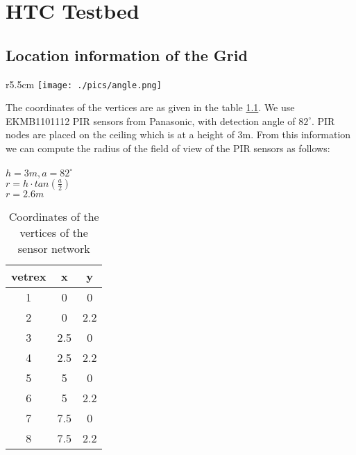 \chapter{HTC Testbed}
\label{app:A}
\section{Location information of the Grid}
\begin{wrapfigure}{r}{5.5cm}
\texttt{[image: ./pics/angle.png]}
\label{fig:height}
\end{wrapfigure}
The coordinates of the vertices are as given in the table \ref{tab:htc34xy}. We use EKMB1101112 PIR sensors from Panasonic, with detection angle of $82^\circ$.
PIR nodes are placed on the ceiling which is at a height of 3m. From this information we can compute the radius of the field of view of the PIR sensors as follows:\\\\
$h=3m, a = 82^{\circ}$\\
$r=h\cdot tan(\frac{a}{2})$\\
$r=2.6m$\\






\begin{table}[]
\centering
\caption{Coordinates of the vertices of the sensor network}
\label{tab:htc34xy}
\begin{tabular}{|c|c|c|}
\hline
vetrex & x   & y   \\ \hline
1      & 0   & 0   \\ \hline
2      & 0   & 2.2 \\ \hline
3      & 2.5 & 0   \\ \hline
4      & 2.5 & 2.2 \\ \hline
5      & 5   & 0   \\ \hline
6      & 5   & 2.2 \\ \hline
7      & 7.5 & 0   \\ \hline
8      & 7.5 & 2.2 \\ \hline
\end{tabular}
\end{table}

